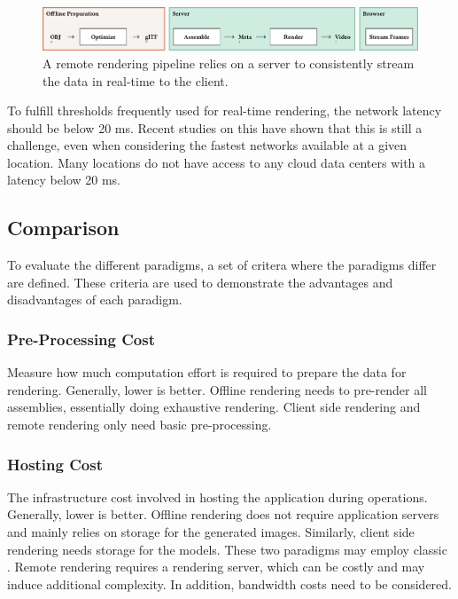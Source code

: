 \begin{figure}[H]
  \includegraphics[width=\columnwidth]{resources/cad-pipeline-remote.png}
  \caption{A remote rendering pipeline relies on a server to consistently stream the data in real-time to the client.}
  \label{fig:cad-remote}
\end{figure}

To fulfill thresholds frequently used for real-time rendering, the network latency should be below 20 ms. Recent studies on this have shown that this is still a challenge, even when considering the fastest networks available at a given location. Many locations do not have access to any cloud data centers with a latency below 20 ms. \cite{cloudLatency}

\subsection*{Comparison}

To evaluate the different paradigms, a set of critera where the paradigms differ are defined. These criteria are used to demonstrate the advantages and disadvantages of each paradigm.

\subsubsection{Pre-Processing Cost}

Measure how much computation effort is required to prepare the data for rendering. Generally, lower is better. Offline rendering needs to pre-render all assemblies, essentially doing exhaustive rendering. Client side rendering and remote rendering only need basic pre-processing.

\subsubsection{Hosting Cost}

The infrastructure cost involved in hosting the application during operations. Generally, lower is better. Offline rendering does not require application servers and mainly relies on storage for the generated images. Similarly, client side rendering needs storage for the models. These two paradigms may employ classic . Remote rendering requires a rendering server, which can be costly and may induce additional complexity. In addition, bandwidth costs need to be considered.

